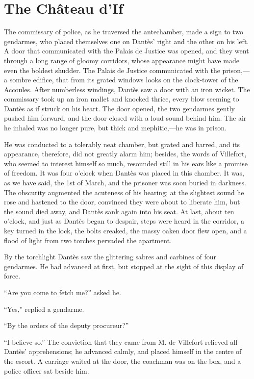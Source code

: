 \chapter{The Château d’If}

The commissary of police, as he traversed the antechamber, made a sign
to two gendarmes, who placed themselves one on Dantès’ right and the
other on his left. A door that communicated with the Palais de Justice
was opened, and they went through a long range of gloomy corridors,
whose appearance might have made even the boldest shudder. The Palais
de Justice communicated with the prison,—a sombre edifice, that from
its grated windows looks on the clock-tower of the Accoules. After
numberless windings, Dantès saw a door with an iron wicket. The
commissary took up an iron mallet and knocked thrice, every blow
seeming to Dantès as if struck on his heart. The door opened, the two
gendarmes gently pushed him forward, and the door closed with a loud
sound behind him. The air he inhaled was no longer pure, but thick and
mephitic,—he was in prison.

He was conducted to a tolerably neat chamber, but grated and barred,
and its appearance, therefore, did not greatly alarm him; besides, the
words of Villefort, who seemed to interest himself so much, resounded
still in his ears like a promise of freedom. It was four o’clock when
Dantès was placed in this chamber. It was, as we have said, the 1st of
March, and the prisoner was soon buried in darkness. The obscurity
augmented the acuteness of his hearing; at the slightest sound he rose
and hastened to the door, convinced they were about to liberate him,
but the sound died away, and Dantès sank again into his seat. At last,
about ten o’clock, and just as Dantès began to despair, steps were
heard in the corridor, a key turned in the lock, the bolts creaked, the
massy oaken door flew open, and a flood of light from two torches
pervaded the apartment.

By the torchlight Dantès saw the glittering sabres and carbines of four
gendarmes. He had advanced at first, but stopped at the sight of this
display of force.

“Are you come to fetch me?” asked he.

“Yes,” replied a gendarme.

“By the orders of the deputy procureur?”

“I believe so.” The conviction that they came from M. de Villefort
relieved all Dantès’ apprehensions; he advanced calmly, and placed
himself in the centre of the escort. A carriage waited at the door, the
coachman was on the box, and a police officer sat beside him.

